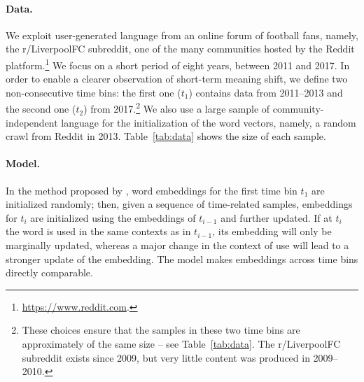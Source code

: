 
\paragraph{Data.}
We exploit user-generated language from an online forum of football fans,
namely, the r/LiverpoolFC subreddit, one of the many communities hosted
by the Reddit platform.\footnote{\url{https://www.reddit.com}.}
We focus on a short period of eight years, between 2011 and 2017. 
In order to enable a clearer observation of short-term meaning shift, we define two
non-consecutive time bins: the first one ($t_1$) contains data from
2011--2013 and the second one ($t_2$) from 2017.\footnote{These choices
  ensure that the samples in these two time bins are approximately of the same size -- see Table~\ref{tab:data}. The
  r/LiverpoolFC subreddit exists since 2009, but very little content
  was produced in 2009--2010.}
 We also use a large sample of community-independent language for the
initialization of the word vectors, namely, a random crawl from Reddit
in 2013.
Table~\ref{tab:data} shows the size of each sample.



\paragraph{Model.}

In the method proposed by , word
embeddings for the first time bin $t_1$ are initialized randomly; then,
given a sequence of time-related samples, embeddings for $t_i$
are initialized using the embeddings of $t_{i-1}$ and further
updated. 
If at $t_i$ the word is used in the same contexts as in $t_{i-1}$, its embedding will only be marginally updated, whereas a major change in the context of use will lead to a stronger update of the embedding. The model makes embeddings across time bins directly comparable.

